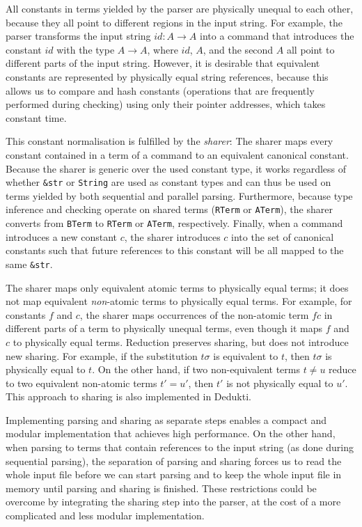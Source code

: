 \documentclass[screen,sigplan,10pt]{acmart}
\begin{document}
All constants in terms yielded by the parser are physically unequal to
each other, because they all point to different regions in the input
string. For example, the parser transforms the input string
\(id\!:A \to A\) into a command that introduces the constant \(id\) with
the type \(A \to A\), where \(id\), \(A\), and the second \(A\) all
point to different parts of the input string. However, it is desirable
that equivalent constants are represented by physically equal string
references, because this allows us to compare and hash constants
(operations that are frequently performed during checking) using only
their pointer addresses, which takes constant time.

This constant normalisation is fulfilled by the \emph{sharer}: The
sharer maps every constant contained in a term of a command to an
equivalent canonical constant. Because the sharer is generic over the
used constant type, it works regardless of whether \texttt{\&str} or
\texttt{String} are used as constant types and can thus be used on terms
yielded by both sequential and parallel parsing. Furthermore, because
type inference and checking operate on shared terms (\texttt{RTerm} or
\texttt{ATerm}), the sharer converts from \texttt{BTerm} to
\texttt{RTerm} or \texttt{ATerm}, respectively. Finally, when a command
introduces a new constant \(c\), the sharer introduces \(c\) into the
set of canonical constants such that future references to this constant
will be all mapped to the same \texttt{\&str}.

The sharer maps only equivalent atomic terms to physically equal terms;
it does not map equivalent \emph{non}-atomic terms to physically equal
terms. For example, for constants \(f\) and \(c\), the sharer maps
occurrences of the non-atomic term \(f c\) in different parts of a term
to physically unequal terms, even though it maps \(f\) and \(c\) to
physically equal terms. Reduction preserves sharing, but does not
introduce new sharing. For example, if the substitution \(t \sigma\) is
equivalent to \(t\), then \(t \sigma\) is physically equal to \(t\). On
the other hand, if two non-equivalent terms \(t \neq u\) reduce to two
equivalent non-atomic terms \(t' = u'\), then \(t'\) is not physically
equal to \(u'\). This approach to sharing is also implemented in
Dedukti.

Implementing parsing and sharing as separate steps enables a compact and
modular implementation that achieves high performance. On the other
hand, when parsing to terms that contain references to the input string
(as done during sequential parsing), the separation of parsing and
sharing forces us to read the whole input file before we can start
parsing and to keep the whole input file in memory until parsing and
sharing is finished. These restrictions could be overcome by integrating
the sharing step into the parser, at the cost of a more complicated and
less modular implementation.
\end{document}
